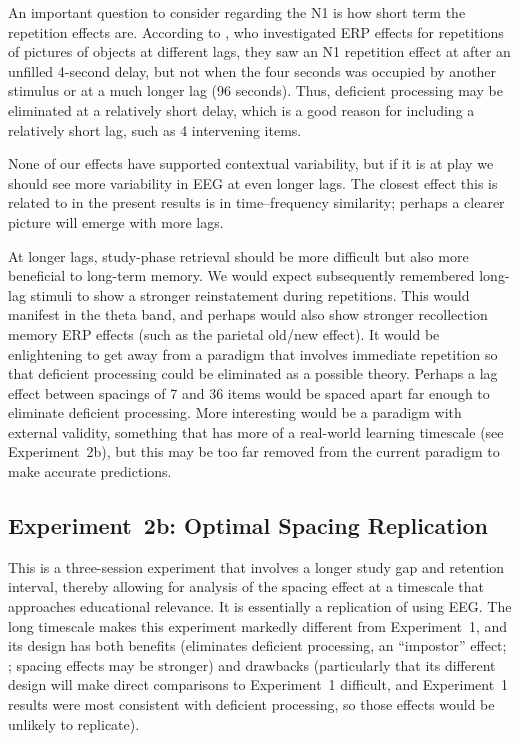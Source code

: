 \cbstart
An important question to consider regarding the N1 is how short term the repetition effects are.  According to , who investigated ERP effects for repetitions of pictures of objects at different lags, they saw an N1 repetition effect at after an unfilled 4-second delay, but not when the four seconds was occupied by another stimulus or at a much longer lag (96 seconds).  Thus, deficient processing may be eliminated at a relatively short delay, which is a good reason for including a relatively short lag, such as 4 intervening items.
\cbend

None of our effects have supported contextual variability, but if it is at play we should see more variability in EEG at even longer lags.  The closest effect this is related to in the present results is in time--frequency similarity; perhaps a clearer picture will emerge with more lags.

At longer lags, study-phase retrieval should be more difficult but also more beneficial to long-term memory.  We would expect subsequently remembered long-lag stimuli to show a stronger reinstatement during repetitions.  This would manifest in the theta band, and perhaps would also show stronger recollection memory ERP effects (such as the parietal old/new effect).
It would be enlightening to get away from a paradigm that involves immediate repetition so that deficient processing could be eliminated as a possible theory.  Perhaps a lag effect between spacings of 7 and 36 items would be spaced apart far enough to eliminate deficient processing.  More interesting would be a paradigm with external validity, something that has more of a real-world learning timescale (see Experiment~2b), but this may be too far removed from the current paradigm to make accurate predictions.

\subsection{Experiment~2b: Optimal Spacing Replication}

This is a three-session experiment that involves a longer study gap and retention interval, thereby allowing for analysis of the spacing effect at a timescale that approaches educational relevance.  It is essentially a replication of  using EEG.  The long timescale makes this experiment markedly different from Experiment~1, and its design has both benefits (eliminates deficient processing, an ``impostor'' effect; ; spacing effects may be stronger) and drawbacks (particularly that its different design will make direct comparisons to Experiment~1 difficult, and Experiment~1 results were most consistent with deficient processing, so those effects would be unlikely to replicate).

